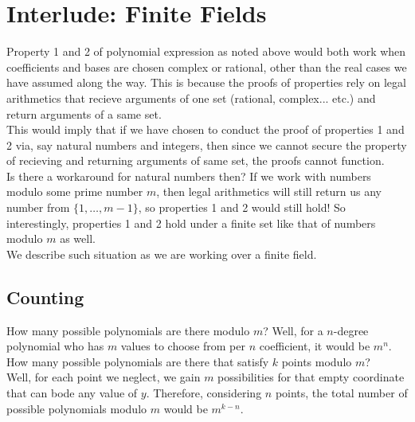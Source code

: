\section{Interlude: Finite Fields}
Property 1 and 2 of polynomial expression as noted above would both work when coefficients and bases are chosen complex or rational, other than the real cases we have assumed along the way. This is because the proofs of properties rely on legal arithmetics that recieve arguments of one set (rational, complex... etc.) and return arguments of a same set. \\
This would imply that if we have chosen to conduct the proof of properties 1 and 2 via, say natural numbers and integers, then since we cannot secure the property of recieving and returning arguments of same set, the proofs cannot function. \\
Is there a workaround for natural numbers then? If we work with numbers modulo some prime number $m$, then legal arithmetics will still return us any number from $\{1, \dots, m - 1\}$, so properties 1 and 2 would still hold! So interestingly, properties 1 and 2 hold under a finite set like that of numbers modulo $m$ as well. \\
We describe such situation as we are working over a finite field.

\subsection{Counting}
How many possible polynomials are there modulo $m$? Well, for a $n$-degree polynomial who has $m$ values to choose from per $n$ coefficient, it would be $m^n$. \\
How many possible polynomials are there that satisfy $k$ points modulo $m$? \\
Well, for each point we neglect, we gain $m$ possibilities for that empty coordinate that can bode any value of $y$. Therefore, considering $n$ points, the total number of possible polynomials modulo $m$ would be $m^{k - n}$.

